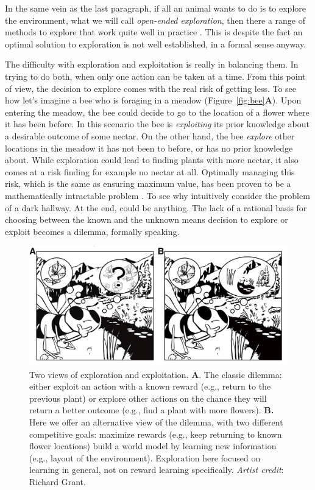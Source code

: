 \documentclass[9pt,lineno]{elife}
\begin{document}
In the same vein as the last paragraph, if all an animal wants to do is to explore the environment, what we will call \textit{open-ended exploration}, then there a range of methods to explore that work quite well in practice \citep{Sutton1990,dayan1996exploration,Sutton1998-kw,daw2006cortical,findling2018computational,Friston2016}. This is despite the fact an optimal solution to exploration is not well established, in a formal sense anyway. 

The difficulty with exploration and exploitation is really in balancing them. In trying to do both, when only one action can be taken at a time. From this point of view, the decision to explore comes with the real risk of getting less. To see how let's imagine a bee who is foraging in a meadow (Figure~\ref{fig:bee}\textbf{A}). Upon entering the meadow, the bee could decide to go to the location of a flower where it has been before. In this scenario the bee is \textit{exploiting} its prior knowledge about a desirable outcome of some nectar. On the other hand, the bee \textit{explore} other locations in the meadow it has not been to before, or has no prior knowledge about. While exploration could lead to finding plants with more nectar, it also comes at a risk finding for example no nectar at all. Optimally managing this risk, which is the same as ensuring maximum value, has been proven to be a mathematically intractable problem \citep{Thrun1992a,Dayan1996,findling2018computational,gershman2018deconstructing}. To see why intuitively consider the problem of a dark hallway. At the end, could be anything. The lack of a rational basis for choosing between the known and the unknown means decision to explore or exploit becomes a dilemma, formally speaking.


\begin{figure}
	[tbhp] \centering 
	\includegraphics[width=.8\linewidth]{figures/fig1.png} 
	\caption{Two views of exploration and exploitation. \textbf{A}. The classic dilemma: either exploit an action with a known reward (e.g., return to the previous plant) or explore other actions on the chance they will return a better outcome (e.g., find a plant with more flowers). \textbf{B.} Here we offer an alternative view of the dilemma, with two different competitive goals: maximize rewards (e.g., keep returning to known flower locations)  build a world model by learning new information (e.g., layout of the environment). Exploration here focused on learning in general, not on reward learning specifically. \textit{Artist credit}: Richard Grant.}
	\label{fig:f1} 
\end{figure}
\end{document}
